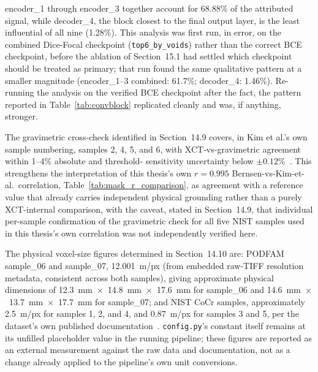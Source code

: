 encoder\_1 through encoder\_3 together account for 68.88\% of the attributed signal, while decoder\_4,
the block closest to the final output layer, is the least influential of all nine (1.28\%). This
analysis was first run, in error, on the combined Dice-Focal checkpoint (\texttt{top6\_by\_voids})
rather than the correct BCE checkpoint, before the ablation of Section~15.1 had settled which
checkpoint should be treated as primary; that run found the same qualitative pattern at a smaller
magnitude (encoder\_1--3 combined: 61.7\%; decoder\_4: 1.46\%). Re-running the analysis on the verified
BCE checkpoint after the fact, the pattern reported in Table~\ref{tab:convblock} replicated cleanly and
was, if anything, stronger.

The gravimetric cross-check identified in Section~14.9 covers, in Kim et al.'s own sample numbering,
samples 2, 4, 5, and 6, with XCT-vs-gravimetric agreement within 1--4\% absolute and threshold-
sensitivity uncertainty below $\pm 0.12\%$~\citep{Kim2017}. This strengthens the interpretation of this
thesis's own $r = 0.995$ Bernsen-vs-Kim-et-al.\ correlation, Table~\ref{tab:mask_r_comparison}, as
agreement with a reference value that already carries independent physical grounding rather than a
purely XCT-internal comparison, with the caveat, stated in Section~14.9, that individual per-sample
confirmation of the gravimetric check for all five NIST samples used in this thesis's own correlation
was not independently verified here.

The physical voxel-size figures determined in Section~14.10 are: PODFAM sample\_06 and sample\_07,
12.001~\textmu m/px (from embedded raw-TIFF resolution metadata, consistent across both samples),
giving approximate physical dimensions of 12.3~mm~$\times$~14.8~mm~$\times$~17.6~mm for sample\_06 and
14.6~mm~$\times$~13.7~mm~$\times$~17.7~mm for sample\_07; and NIST CoCr samples, approximately
2.5~\textmu m/px for samples 1, 2, and 4, and 0.87~\textmu m/px for samples 3 and 5, per the dataset's
own published documentation~\citep{NIST_CoCr}. \texttt{config.py}'s  constant
itself remains at its unfilled placeholder value in the running pipeline; these figures are reported
as an external measurement against the raw data and documentation, not as a change already applied to
the pipeline's own unit conversions.
